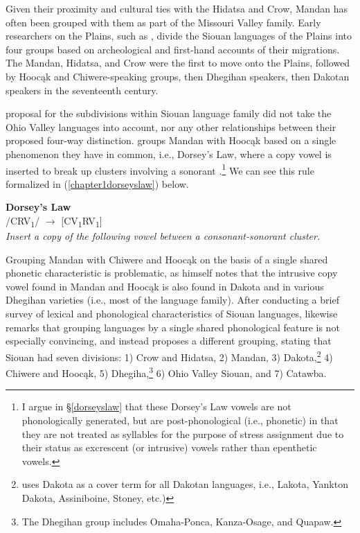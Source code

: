 Given their proximity and cultural ties with the Hidatsa and Crow, Mandan has often been grouped with them as part of the Missouri Valley family. Early researchers on the Plains, such as \citet[97]{will1906}, divide the Siouan languages of the Plains into four groups based on archeological and first-hand accounts of their migrations. The Mandan, Hidatsa, and Crow were the first to move onto the Plains, followed by Hoocąk and Chiwere-speaking groups, then Dhegihan speakers, then Dakotan speakers in the seventeenth century.

 proposal for the subdivisions within Siouan language family did not take the Ohio Valley languages into account, nor any other relationships between their proposed four-way distinction. \citet[249]{voegelin1941} groups Mandan with Hoocąk based on a single phenomenon they have in common, i.e., Dorsey's Law, where a copy vowel is inserted to break up clusters involving a sonorant \citep[923]{dorsey1885}.\footnote{I argue in \S\ref{dorseyslaw} that these Dorsey's Law vowels are not phonologically generated, but are post-phonological (i.e., phonetic) in that they are not treated as syllables for the purpose of stress assignment due to their status as excrescent (or intrusive) vowels rather than epenthetic vowels.} We can see this rule formalized in (\ref{chapter1dorseyslaw}) below.

\begin{exe}

\item\label{chapter1dorseyslaw} \textbf{Dorsey's Law}\\
/CRV\textsubscript{1}/ $\to$ [CV\textsubscript{1}RV\textsubscript{1}]\\
	\textit{Insert a copy of the following vowel between a consonant-sonorant cluster.}

\end{exe}

Grouping Mandan with Chiwere and Hoocąk on the basis of a single shared phonetic characteristic is problematic, as \citet[246]{voegelin1941} himself notes that the intrusive copy vowel found in Mandan and Hoocąk is also found in Dakota and in various Dhegihan varieties (i.e., most of the language family). After conducting a brief survey of lexical and phonological characteristics of Siouan languages, \citet{wolff1950a,wolff1950b,wolff1950c,wolff1951} likewise remarks that grouping languages by a single shared phonological feature is not especially convincing, and instead proposes a different grouping, stating that Siouan had seven divisions: 1) Crow and Hidatsa, 2) Mandan, 3) Dakota,\footnote{\citet{wolff1950a,wolff1950b,wolff1950c,wolff1951} uses Dakota as a cover term for all Dakotan languages, i.e., Lakota, Yankton Dakota, Assiniboine, Stoney, etc.)} 4) Chiwere and Hoocąk, 5) Dhegiha,\footnote{The Dhegihan group includes Omaha-Ponca, Kanza-Osage, and Quapaw.} 6) Ohio Valley Siouan, and 7) Catawba.

